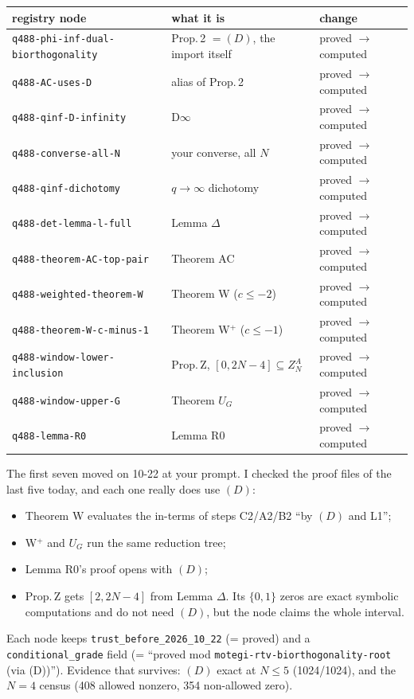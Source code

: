 \documentclass[11pt]{article}
\theoremstyle{plain}
\begin{document}
\begin{center}\small
\begin{tabular}{lll}
\toprule
registry node & what it is & change\\
\midrule
\texttt{q488-phi-inf-dual-biorthogonality} & Prop.\,2 $=(D)$, the import itself & proved $\to$ computed\\
\texttt{q488-AC-uses-D} & alias of Prop.\,2 & proved $\to$ computed\\
\texttt{q488-qinf-D-infinity} & D$\infty$ & proved $\to$ computed\\
\texttt{q488-converse-all-N} & your converse, all $N$ & proved $\to$ computed\\
\texttt{q488-qinf-dichotomy} & $q\to\infty$ dichotomy & proved $\to$ computed\\
\texttt{q488-det-lemma-l-full} & Lemma $\Delta$ & proved $\to$ computed\\
\texttt{q488-theorem-AC-top-pair} & Theorem AC & proved $\to$ computed\\
\midrule
\texttt{q488-weighted-theorem-W} & Theorem W ($c\le-2$) & proved $\to$ computed\\
\texttt{q488-theorem-W-c-minus-1} & Theorem W$^+$ ($c\le-1$) & proved $\to$ computed\\
\texttt{q488-window-lower-inclusion} & Prop.\,Z, $[0,2N-4]\subseteq Z^A_N$ & proved $\to$ computed\\
\texttt{q488-window-upper-G} & Theorem $U_G$ & proved $\to$ computed\\
\texttt{q488-lemma-R0} & Lemma R0 & proved $\to$ computed\\
\bottomrule
\end{tabular}
\end{center}
The first seven moved on 10-22 at your prompt. I checked the proof files of the last five today, and each one really
does use $(D)$:
\begin{itemize}[leftmargin=*,itemsep=1pt]
\item Theorem W evaluates the in-terms of steps C2/A2/B2 ``by $(D)$ and L1'';
\item W$^+$ and $U_G$ run the same reduction tree;
\item Lemma R0's proof opens with $(D)$;
\item Prop.\,Z gets $[2,2N-4]$ from Lemma $\Delta$. Its $\{0,1\}$ zeros are exact symbolic computations and do not need
  $(D)$, but the node claims the whole interval.
\end{itemize}
Each node keeps \texttt{trust\_before\_2026\_10\_22} (= proved) and a \texttt{conditional\_grade} field
(= ``proved mod \texttt{motegi-rtv-biorthogonality-root} (via (D))''). Evidence that survives: $(D)$ exact at $N\le5$ (1024/1024), and the $N=4$
census (408 allowed nonzero, 354 non-allowed zero).
\end{document}
